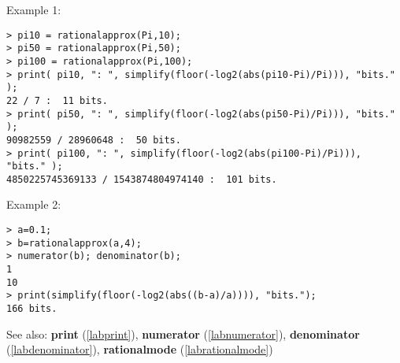 \noindent Example 1: 
\begin{center}\begin{minipage}{15cm}\begin{Verbatim}[frame=single]
> pi10 = rationalapprox(Pi,10);
> pi50 = rationalapprox(Pi,50);
> pi100 = rationalapprox(Pi,100);
> print( pi10, ": ", simplify(floor(-log2(abs(pi10-Pi)/Pi))), "bits." );
22 / 7 :  11 bits.
> print( pi50, ": ", simplify(floor(-log2(abs(pi50-Pi)/Pi))), "bits." );
90982559 / 28960648 :  50 bits.
> print( pi100, ": ", simplify(floor(-log2(abs(pi100-Pi)/Pi))), "bits." );
4850225745369133 / 1543874804974140 :  101 bits.
\end{Verbatim}
\end{minipage}\end{center}
\noindent Example 2: 
\begin{center}\begin{minipage}{15cm}\begin{Verbatim}[frame=single]
> a=0.1;
> b=rationalapprox(a,4);
> numerator(b); denominator(b);
1
10
> print(simplify(floor(-log2(abs((b-a)/a)))), "bits.");
166 bits.
\end{Verbatim}
\end{minipage}\end{center}
See also: \textbf{print} (\ref{labprint}), \textbf{numerator} (\ref{labnumerator}), \textbf{denominator} (\ref{labdenominator}), \textbf{rationalmode} (\ref{labrationalmode})
